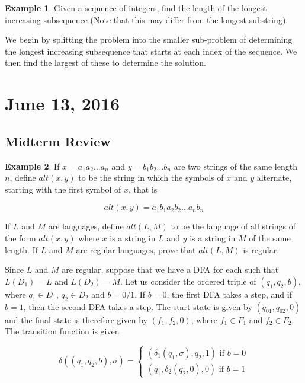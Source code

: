 \documentclass[11pt]{article}
\theoremstyle{plain} %
\theoremstyle{definition}
\theoremstyle{example}
\newtheorem*{example}{Example}
\theoremstyle{remark}
\begin{document}
\begin{example}
Given a sequence of integers, find the length of the longest increasing subsequence (Note that this may differ from the longest substring).
\end{example}

We begin by splitting the problem into the smaller sub-problem of determining the longest increasing subsequence that starts at each index of the sequence. We then find the largest of these to determine the solution.



\section{June 13, 2016}






\subsection{Midterm Review}

\begin{example}
If $x = a_1a_2...a_n$ and $y = b_1b_2...b_n$ are two strings of the same length $n$, define $alt(x,y)$ to be the string in which the symbols of $x$ and $y$ alternate, starting with the first symbol of $x$, that is

$$alt(x,y) = a_1b_1a_2b_2...a_nb_n$$

If $L$ and $M$ are languages, define $alt(L,M)$ to be the language of all strings of the form $alt(x,y)$ where $x$ is a string in $L$ and $y$ is a string in $M$ of the same length. If $L$ and $M$ are regular languages, prove that $alt(L,M)$ is regular.
\end{example}

Since $L$ and $M$ are regular, suppose that we have a DFA for each such that $L(D_1) = L$ and $L(D_2)=M$. Let us consider the ordered triple of $(q_1, q_2, b)$, where $q_1 \in D_1$, $q_2 \in D_2$ and $b = 0/1$. If $b = 0$, the first DFA takes a step, and if $b=1$, then the second DFA takes a step. The start state is given by $(q_{01}, q_{02}, 0)$ and the final state is therefore given by $(f_1, f_2, 0)$, where $f_1 \in F_1$ and $f_2 \in F_2$. The transition function is given

$$\delta((q_1, q_2, b), \sigma) = \begin{cases}
(\delta_1(q_1, \sigma), q_2, 1) \text{ if } b = 0\\
(q_1, \delta_2(q_2, 0), 0) \text{ if } b = 1
\end{cases}$$
\end{document}
